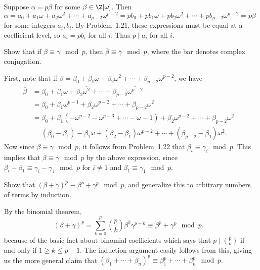 \documentclass[11pt,letterpaper]{article}
\begin{document}
\begin{solution}
    Suppose $\alpha = p\beta$ for some $\beta\in \Z[\omega]$. Then
    \[
        \alpha = a_0+a_1\omega+a_2\omega^2+\cdots+a_{p-2}\omega^{p-2}=pb_0+pb_1\omega+pb_2\omega^2+\cdots+pb_{p-2}\omega^{p-2} = p\beta
    \]
    for some integers $a_i, b_i$. By Problem~1.21, these expressions must be equal at a coefficient level, so $a_i=pb_i$ for all $i$. Thus $p\mid a_i$ for all $i$. 
\end{solution}

\begin{cproblem}{1.23}
    Show that if $\beta\equiv \gamma \mod{p}$, then $\overline{\beta}\equiv \overline{\gamma} \mod{p}$, where the bar denotes complex conjugation. 
\end{cproblem}

\begin{solution}
    First, note that if $\beta=\beta_0+\beta_1\omega+\beta_2\omega^2+\cdots+\beta_{p-2}\omega^{p-2}$, we have
    \[
        \begin{aligned}
            \overline{\beta}&=\beta_0+\beta_1\overline{\omega}+\beta_2\overline{\omega^2}+\cdots+\beta_{p-2}\overline{\omega^{p-2}}\\
            &=\beta_0+\beta_1\omega^{p-1}+\beta_2\omega^{p-2}+\cdots+\beta_{p-2}\omega^2\\
            &=\beta_0+\beta_1(-\omega^{p-2}-\omega^{p-3}+\cdots-\omega-1)+\beta_2\omega^{p-2}+\cdots+\beta_{p-2}\omega^2\\
            &=(\beta_0-\beta_1)-\beta_1\omega+(\beta_2-\beta_1)\omega^{p-2}+\cdots+(\beta_{p-2}-\beta_1)\omega^2.
        \end{aligned}
    \] 
    Now since $\beta\equiv \gamma\mod p$, it follows from Problem~1.22 that $\beta_i\equiv \gamma_i\mod p$. This implies that $\overline{\beta}\equiv \overline{\gamma}\mod p$ by the above expression, since $\beta_i-\beta_1\equiv \gamma_i-\gamma_1\mod p$ for $i\neq 1$ and $\beta_1\equiv \gamma_1\mod p$.
\end{solution}

\begin{cproblem}{1.24}
    Show that $(\beta+\gamma)^p\equiv \beta^p+\gamma^p\mod{p}$, and generalize this to arbitrary numbers of terms by induction. 
\end{cproblem}

\begin{solution}
    By the binomial theorem,
    \[
        (\beta+\gamma)^p=\sum^p_{k=0}\binom{p}{k}\beta^k\gamma^{p-k}\equiv \beta^p+\gamma^p\mod{p}
    .\] 
    because of the basic fact about binomial coefficients which says that $p\mid \binom{p}{k}$ if and only if $1\geq k\leq p-1$. The induction argument easily follows from this, giving us the more general claim that $(\beta_1+\cdots+\beta_n)^p\equiv \beta_1^p+\cdots+\beta_n^p\mod{p}$.
\end{solution}
\end{document}

